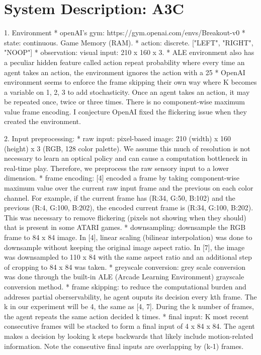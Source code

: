 \documentclass[twoside,11pt]{article}
\begin{document}
\section{System Description: A3C}


1. Environment
	* openAI's gym: https://gym.openai.com/envs/Breakout-v0
	* state: continuous. Game Memory (RAM).
	* action: discrete. ["LEFT", "RIGHT", "NOOP"]
	* observation: visual input: 210 x 160 x 3.
	* ALE environment also has a peculiar hidden feature called action repeat probability where every time an agent takes an action, the environment ignores the action with a 25%
	* OpenAI environment seems to enforce the frame skipping their own way where K becomes a variable on {1, 2, 3} to add stochasticity. Once an agent takes an action, it may be repeated once, twice or three times. There is no component-wise maximum value frame encoding. I conjecture OpenAI fixed the flickering issue when they created the environment.

2. Input preprocessing:
	* raw input: pixel-based image: 210 (width) x 160 (height) x 3 (RGB, 128 color palette). We assume this much of resolution is not necessary to learn an optical policy and can cause a computation bottleneck in real-time play. Therefore, we preprocess the raw sensory input to a lower dimension.
	* frame encoding: [4] encoded a frame by taking component-wise maximum value over the current raw input frame and the previous on each color channel. For example, if the current frame has (R:34, G:50, B:102) and the previous (R:4, G:100, B:202), the encoded current frame is (R:34, G:100, B:202). This was necessary to remove flickering (pixels not showing when they should) that is present in some ATARI games.
	* downsampling: downsample the RGB frame to 84 x 84 image. In [4], linear scaling (bilinear interpolation) was done to downsample without keeping the original image aspect ratio. In [7], the image was downsampled to 110 x 84 with the same aspect ratio and an additional step of cropping to 84 x 84 was taken. 
	* greyscale conversion: grey scale conversion was done through the built-in ALE (Arcade Learning Environment) grayscale conversion method.
	* frame skipping: to reduce the computational burden and addreses partial oberservability, he agent ouputs its decision every kth frame. The k in our experiment will be 4, the same as [4, 7]. During the k number of frames, the agent repeats the same action decided k times. 
	* final input: K most recent consecutive frames will be stacked to form a final input of 4 x 84 x 84. The agent makes a decision by looking k steps backwards that likely include motion-related information. Note the conseutive final inputs are overlapping by (k-1) frames.
 
\end{document}
